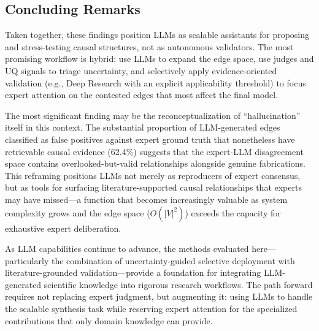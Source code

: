 \subsection{Concluding Remarks}
\label{sec:conclusion_remarks}

Taken together, these findings position LLMs as scalable assistants for proposing and stress-testing causal structures, not as autonomous validators. The most promising workflow is hybrid: use LLMs to expand the edge space, use judges and UQ signals to triage uncertainty, and selectively apply evidence-oriented validation (e.g., Deep Research with an explicit applicability threshold) to focus expert attention on the contested edges that most affect the final model.



The most significant finding may be the reconceptualization of ``hallucination'' itself in this context. The substantial proportion of LLM-generated edges classified as false positives against expert ground truth that nonetheless have retrievable causal evidence (62.4\%) suggests that the expert-LLM disagreement space contains overlooked-but-valid relationships alongside genuine fabrications. This reframing positions LLMs not merely as reproducers of expert consensus, but as tools for surfacing literature-supported causal relationships that experts may have missed---a function that becomes increasingly valuable as system complexity grows and the edge space ($O(|V|^2)$) exceeds the capacity for exhaustive expert deliberation.

As LLM capabilities continue to advance, the methods evaluated here---particularly the combination of uncertainty-guided selective deployment with literature-grounded validation---provide a foundation for integrating LLM-generated scientific knowledge into rigorous research workflows. The path forward requires not replacing expert judgment, but augmenting it: using LLMs to handle the scalable synthesis task while reserving expert attention for the specialized contributions that only domain knowledge can provide.




